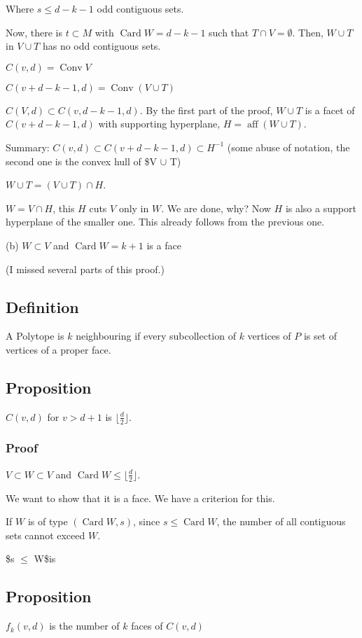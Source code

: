 \documentclass[11pt]{article}
\def\aff{\operatorname{aff}}
\def\conv{\operatorname{Conv}}
\def\card{\operatorname{Card}}
\begin{document}
{{Where \(s \le d - k - 1\) odd contiguous sets.

Now, there is \(t \subset M\) with \(\card W = d - k - 1\) such that \(T \cap V =
    \emptyset\). Then, \(W \cup T\) in \(V \cup T\) has no odd contiguous sets.

\(C(v, d) = \conv V\)

\(C(v+d - k - 1, d) = \conv(V \cup T)\)

\(C(V, d) \subset C(v, d - k -1, d)\). By the first part of the proof, \(W \cup
    T\) is a facet of \(C(v + d - k - 1, d)\) with supporting hyperplane, \(H =
    \aff(W \cup T)\).

Summary: \(C(v, d) \subset C(v + d - k - 1, d) \subset H^{-1}\) (some abuse of
notation, the second one is the convex hull of \$V \(\cup\) T)

\(W \cup T = (V \cup T) \cap H\).

\(W = V \cap H\), this \(H\) cuts \(V\) only in \(W\). We are done, why? Now \(H\) is
also a support hyperplane of the smaller one. This already follows from the
previous one.

(b) \(W \subset V\) and \(\card W = k + 1\) is a face

(I missed several parts of this proof.)
\subsection{Definition}
\label{sec:org9943296}
A Polytope is \(k\) neighbouring if every subcollection of \(k\) vertices of \(P\)
is set of vertices of a proper face.
\subsection{Proposition}
\label{sec:org208dbd0}
\(C(v, d)\) for \(v > d+1\) is \(\lfloor \frac{d}{2} \rfloor\).
\subsubsection{Proof}
\label{sec:org4dcff97}
\(V \subset W \subset V\) and \(\card W \le \lfloor \frac{d}{2} \rfloor\).

We want to show that it is a face. We have a criterion for this.

If \(W\) is of type \((\card W, s)\), since \(s \le \card W\), the number of all
contiguous sets cannot exceed \(W\).

\$s \(\le\) W\$is
\subsection{Proposition}
\label{sec:org39a7c00}
\(f_k(v, d)\) is the number of \(k\) faces of \(C(v, d)\)

}}
\end{document}
